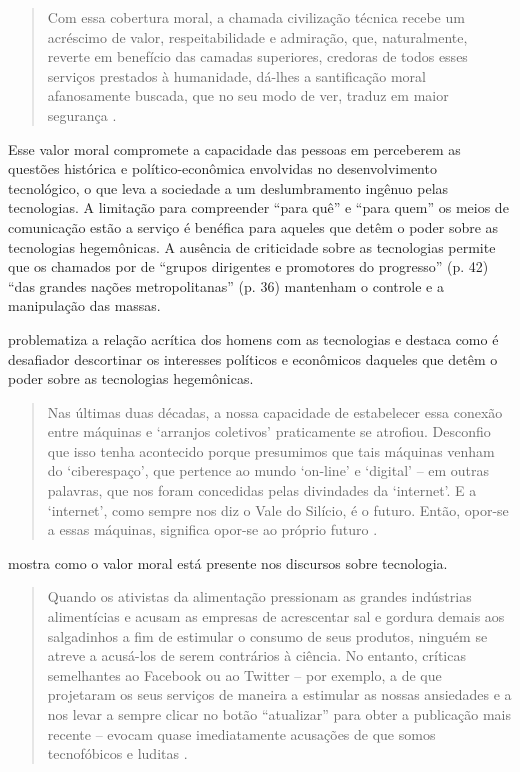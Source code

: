 \documentclass[portuguese]{textolivre}
\begin{document}
\begin{quote}
 Com essa cobertura moral, a chamada civilização técnica recebe um acréscimo de valor, respeitabilidade e admiração, que, naturalmente, reverte em benefício das camadas superiores, credoras de todos esses serviços prestados à humanidade, dá-lhes a santificação moral afanosamente buscada, que no seu modo de ver, traduz em maior segurança \cite[p. 41]{pinto_o_2005}.
\end{quote}

Esse valor moral compromete a capacidade das pessoas em perceberem as questões histórica e político-econômica envolvidas no desenvolvimento tecnológico, o que leva a sociedade a um deslumbramento ingênuo pelas tecnologias. A limitação para compreender “para quê” e “para quem” os meios de comunicação estão a serviço \cite{freire_educar_2011} é benéfica para aqueles que detêm o poder sobre as tecnologias hegemônicas. A ausência de criticidade sobre as tecnologias permite que os chamados por \textcite{pinto_o_2005} de “grupos dirigentes e promotores do progresso” (p. 42) “das grandes nações metropolitanas” (p. 36) mantenham o controle e a manipulação das massas.

\textcite{morozov2018} problematiza a relação acrítica dos homens com as tecnologias e destaca como é desafiador descortinar os interesses políticos e econômicos daqueles que detêm o poder sobre as tecnologias hegemônicas.

\begin{quote}
 Nas últimas duas décadas, a nossa capacidade de estabelecer essa conexão entre máquinas e ‘arranjos coletivos’ praticamente se atrofiou. Desconfio que isso tenha acontecido porque presumimos que tais máquinas venham do ‘ciberespaço’, que pertence ao mundo ‘on-line’ e ‘digital’ – em outras palavras, que nos foram concedidas pelas divindades da ‘internet’. E a ‘internet’, como sempre nos diz o Vale do Silício, é o futuro. Então, opor-se a essas máquinas, significa opor-se ao próprio futuro \cite[p. 42]{morozov2018}.
\end{quote}

\textcite{morozov2018} mostra como o valor moral está presente nos discursos sobre tecnologia.

\begin{quote}
 Quando os ativistas da alimentação pressionam as grandes indústrias alimentícias e acusam as empresas de acrescentar sal e gordura demais aos salgadinhos a fim de estimular o consumo de seus produtos, ninguém se atreve a acusá-los de serem contrários à ciência. No entanto, críticas semelhantes ao Facebook ou ao Twitter – por exemplo, a de que projetaram os seus serviços de maneira a estimular as nossas ansiedades e a nos levar a sempre clicar no botão “atualizar” para obter a publicação mais recente – evocam quase imediatamente acusações de que somos tecnofóbicos e luditas \cite[p. 29]{morozov2018}.
\end{quote}
\end{document}
